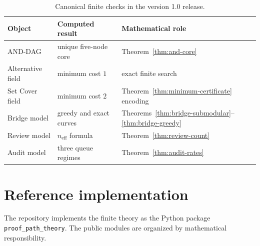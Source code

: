 \documentclass[11pt,oneside]{article}
\theoremstyle{definition}
\theoremstyle{remark}
\begin{document}
\begin{table}[H]
\centering
\caption{Canonical finite checks in the version 1.0 release.}
\begin{tabular}{@{}lll@{}}
\toprule
Object & Computed result & Mathematical role\\
\midrule
AND-DAG & unique five-node core & Theorem~\ref{thm:and-core}\\
Alternative field & minimum cost $1$ & exact finite search\\
Set Cover field & minimum cost $2$ & Theorem~\ref{thm:minimum-certificate} encoding\\
Bridge model & greedy and exact curves & Theorems~\ref{thm:bridge-submodular}--\ref{thm:bridge-greedy}\\
Review model & $n_{\mathrm{eff}}$ formula & Theorem~\ref{thm:review-count}\\
Audit model & three queue regimes & Theorem~\ref{thm:audit-rates}\\
\bottomrule
\end{tabular}
\end{table}

\section{Reference implementation}

The repository implements the finite theory as the Python package \texttt{proof\_path\_theory}. The public modules are organized by mathematical responsibility.
\end{document}
